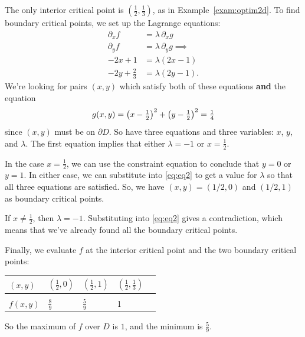 \documentclass[svgnames]{report}
\begin{document}
  \begin{solution}
    The only interior critical point is
    $\left(\tfrac{1}{2},\tfrac{1}{3}\right)$, as in
    Example~\ref{exam:optim2d}. To find boundary critical points, we
    set up the Lagrange equations:
    \begin{align} \nonumber
      \partial_x f &= \lambda \, \partial_x g \\ \nonumber
      \partial_y f &= \lambda \, \partial_y g \implies \\ 
      -2x + 1 &= \lambda(2x - 1)  \\ \label{eq:eq2}
      -2y + \tfrac{2}{3} &= \lambda(2y-1). 
    \end{align}
    We're looking for pairs $(x,y)$ which satisfy both of these
    equations \textbf{and} the equation
    \begin{equation} 
          g(x,y) = \left(x-\tfrac{1}{2}\right)^2 +
          \left(y-\tfrac{1}{2}\right)^2 = \tfrac{1}{4} \\ 
    \end{equation}
    since
    $(x,y)$ must be on $\partial D$. So have three equations and three
    variables: $x$, $y$, and $\lambda$. The first equation implies
    that either $\lambda = -1$ or $x = \tfrac{1}{2}$.

    In the case $x = \frac{1}{2}$, we can use the constraint equation
    to conclude that $y = 0$ or $y = 1$. In either case, we can
    substitute into \eqref{eq:eq2} to get a value for $\lambda$ so
    that all three equations are satisfied. So, we have
    $(x,y) = (1/2, 0)$ and $(1/2,1)$ as boundary critical points.

    If $x \neq \tfrac{1}{2}$, then $\lambda = -1$. Substituting into
    \eqref{eq:eq2} gives a contradiction, which means that we've
    already found all the boundary critical points.

    Finally, we evaluate $f$ at the interior critical point and the
    two boundary critical points:
    \begin{center}
      \begin{tabular}{M{1.2cm}|M{1.2cm}M{1.2cm}M{2cm}N}
        $(x,y)$ & $\left(\frac{1}{2}, 0\right)$  & $\left(\frac{1}{2},
                                1\right)$ &
                                            $\left(\frac{1}{2},
                                            \frac{1}{3} \right)$ &
        \\[12pt] \hline  \\[-8pt] 
        $f(x,y)$ & $\frac{8}{9}$ & $\frac{5}{9}$ & 1 &  \\
      \end{tabular}
    \end{center}
    So the maximum of $f$ over $D$ is $1$, and the minimum is
    $\frac{5}{9}$. 
  \end{solution}
\end{document}

